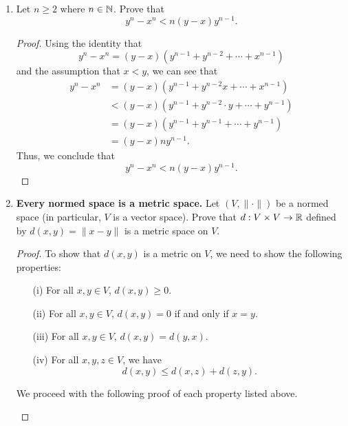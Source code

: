 \documentclass{article}
\begin{document}
\begin{enumerate}
\begin{proof}
    then we see that 
    \[  A^{1 - \frac{ 1 }{ q } } = A^{1 - \Big(  1 - \frac{ 1 }{ p }  \Big)} = A^{\frac{ 1 }{ p }}. \]
    Thus, we see that 
            \[  \Big( \sum_{ i=1  }^{ n } | {x}_{i} +  {y}_{i} | \Big)^{\frac{ 1 }{ p } }  \leq \Big(  \sum_{ i=1  }^{ n } | {x}_{i} |^{p} \Big)^{\frac{ 1 }{ p } } +  \Big(  \sum_{ i=1  }^{ n } | {y}_{i} |^{p} \Big)^{\frac{ 1 }{ p } }.  \]
    \end{proof}
\item Let \( n \geq 2  \) where \( n \in \mathbb{N}  \). Prove that 
    \[  y^{n} - x^{n} < n (y-x) y^{n-1}. \]
    \begin{proof}
    Using the identity that 
    \[  y^{n} - x^{n} = (y - x)(y^{n-1} + y^{n-2} + \cdots + x^{n-1}) \]
    and the assumption that \( x < y  \), we can see that 
    \begin{align*}
        y^{n} - x^{n} &= (y-x)(y^{n-1} + y^{n-2}x + \cdots + x^{n-1})\\
                      &< (y-x)(y^{n-1} + y^{n-2} \cdot y + \cdots + y^{n-1}) \\
                      &= (y-x)(y^{n-1} + y^{n-1} + \cdots + y^{n-1}) \\
                      &= (y-x)n y^{n-1}.
    \end{align*}
    Thus, we conclude that 
    \[  y^{n} - x^{n} < n (y-x) y^{n-1}. \]
    \end{proof}
\item \textbf{Every normed space is a metric space.} Let \( (V, \|\cdot\|) \) be a normed space (in particular, \( V  \) is a vector space). Prove that \( d: V \times V \to \mathbb{R}  \) defined by \( d(x,y) = \|x - y\| \) is a metric space on \( V  \).
    \begin{proof}
    To show that \( d(x,y) \) is a metric on \( V \), we need to show the following properties:
    \begin{enumerate}
        \item[(i)] For all \( x,y \in V  \), \( d(x,y) \geq 0  \).
        \item[(ii)] For all \( x,y \in V  \), \( d(x,y) = 0  \) if and only if \( x = y  \).
        \item[(iii)] For all \( x,y \in V  \), \( d(x,y) = d(y,x) \).
        \item[(iv)] For all \( x,y,z \in V  \), we have
            \[  d(x,y) \leq d(x,z) + d(z,y). \]
    \end{enumerate}
    We proceed with the following proof of each property listed above. 
    \begin{enumerate}

\end{enumerate}
\end{proof}
\end{enumerate}
\end{document}
